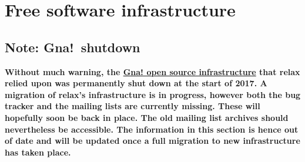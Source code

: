 


\chapter{Free software infrastructure} \label{ch: free software}

\section{Note:  Gna!\ shutdown}

\textbf{Without much warning, the \href{https://en.wikipedia.org/wiki/Gna!}{Gna! open source infrastructure} that relax relied upon was permanently shut down at the start of 2017.
A migration of relax's infrastructure is in progress, however both the bug tracker and the mailing lists are currently missing.
These will hopefully soon be back in place.
The old mailing list archives should nevertheless be accessible.
The information in this section is hence out of date and will be updated once a full migration to new infrastructure has taken place.
}



